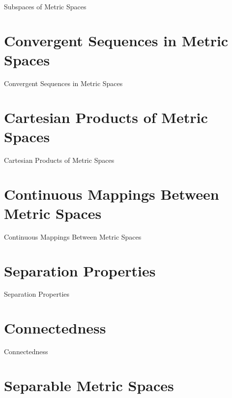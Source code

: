 Subspaces of Metric Spaces

\section{Convergent Sequences in Metric Spaces}
\label{sec:convergent-sequences-in-metric-spaces}

Convergent Sequences in Metric Spaces

\section{Cartesian Products of Metric Spaces}
\label{sec:cartesian-products-of-metric-spaces}

Cartesian Products of Metric Spaces

\section{Continuous Mappings Between Metric Spaces}
\label{sec:continuous-mappings-between-metric-spaces}

Continuous Mappings Between Metric Spaces

\section{Separation Properties}
\label{sec:separation-properties}

Separation Properties

\section{Connectedness}
\label{sec:connectedness}

Connectedness

\section{Separable Metric Spaces}
\label{sec:separable-metric-spaces}

